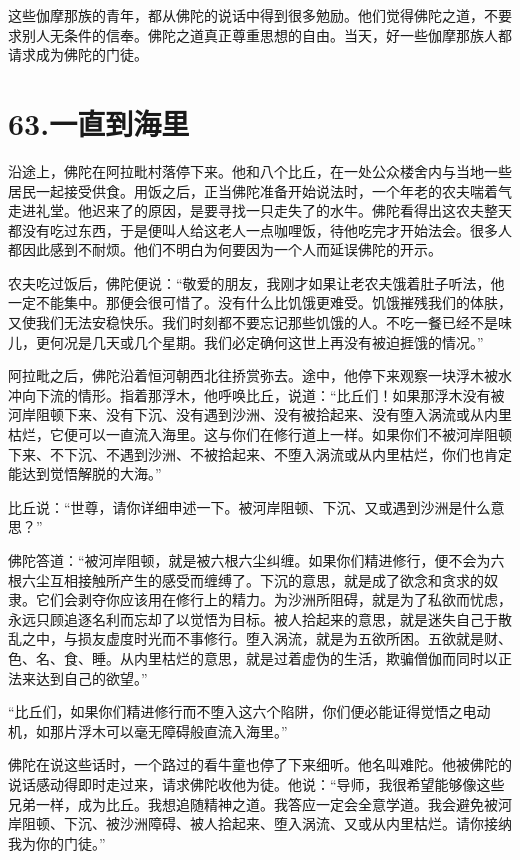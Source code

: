\documentclass[12pt,twoside,openany]{book}
\begin{document}
这些伽摩那族的青年，都从佛陀的说话中得到很多勉励。他们觉得佛陀之道，不要求别人无条件的信奉。佛陀之道真正尊重思想的自由。当天，好一些伽摩那族人都请求成为佛陀的门徒。


\chapter{63.一直到海里}\label{ch63}

沿途上，佛陀在阿拉毗村落停下来。他和八个比丘，在一处公众楼舍内与当地一些居民一起接受供食。用饭之后，正当佛陀准备开始说法时，一个年老的农夫喘着气走进礼堂。他迟来了的原因，是要寻找一只走失了的水牛。佛陀看得出这农夫整天都没有吃过东西，于是便叫人给这老人一点咖哩饭，待他吃完才开始法会。很多人都因此感到不耐烦。他们不明白为何要因为一个人而延误佛陀的开示。

农夫吃过饭后，佛陀便说：“敬爱的朋友，我刚才如果让老农夫饿着肚子听法，他一定不能集中。那便会很可惜了。没有什么比饥饿更难受。饥饿摧残我们的体肤，又使我们无法安稳快乐。我们时刻都不要忘记那些饥饿的人。不吃一餐已经不是味儿，更何况是几天或几个星期。我们必定确何这世上再没有被迫捱饿的情况。”

阿拉毗之后，佛陀沿着恒河朝西北往挢赏弥去。途中，他停下来观察一块浮木被水冲向下流的情形。指着那浮木，他呼唤比丘，说道：“比丘们！如果那浮木没有被河岸阻顿下来、没有下沉、没有遇到沙洲、没有被拾起来、没有堕入涡流或从内里枯烂，它便可以一直流入海里。这与你们在修行道上一样。如果你们不被河岸阻顿下来、不下沉、不遇到沙洲、不被拾起来、不堕入涡流或从内里枯烂，你们也肯定能达到觉悟解脱的大海。”

比丘说：“世尊，请你详细申述一下。被河岸阻顿、下沉、又或遇到沙洲是什么意思？”

佛陀答道：“被河岸阻顿，就是被六根六尘纠缠。如果你们精进修行，便不会为六根六尘互相接触所产生的感受而缠缚了。下沉的意思，就是成了欲念和贪求的奴隶。它们会剥夺你应该用在修行上的精力。为沙洲所阻碍，就是为了私欲而忧虑，永远只顾追逐名利而忘却了以觉悟为目标。被人拾起来的意思，就是迷失自己于散乱之中，与损友虚度时光而不事修行。堕入涡流，就是为五欲所困。五欲就是财、色、名、食、睡。从内里枯烂的意思，就是过着虚伪的生活，欺骗僧伽而同时以正法来达到自己的欲望。”

“比丘们，如果你们精进修行而不堕入这六个陷阱，你们便必能证得觉悟之电动机，如那片浮木可以毫无障碍般直流入海里。”

佛陀在说这些话时，一个路过的看牛童也停了下来细听。他名叫难陀。他被佛陀的说话感动得即时走过来，请求佛陀收他为徒。他说：“导师，我很希望能够像这些兄弟一样，成为比丘。我想追随精神之道。我答应一定会全意学道。我会避免被河岸阻顿、下沉、被沙洲障碍、被人拾起来、堕入涡流、又或从内里枯烂。请你接纳我为你的门徒。”
\end{document}
